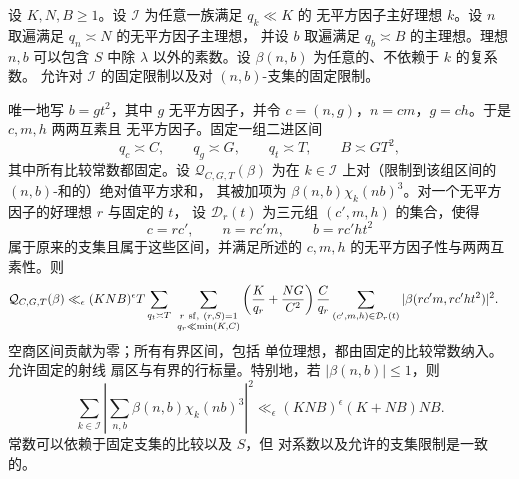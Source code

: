 \begin{lemma}[完备化指标的二次归约]
\label{lem:completed-quadratic-reduction}
设 $K,N,B\ge1$。设 $\mathcal I$ 为任意一族满足 $q_k\ll K$ 的
无平方因子主好理想 $k$。设 $n$ 取遍满足 $q_n\asymp N$ 的无平方因子主理想，
并设 $b$ 取遍满足
$q_b\asymp B$ 的主理想。理想 $n,b$ 可以包含 $S$ 中除
$\lambda$ 以外的素数。设 $\beta(n,b)$ 为任意的、不依赖于 $k$ 的复系数。
允许对 $\mathcal I$ 的固定限制以及对
$(n,b)$-支集的固定限制。

唯一地写 $b=gt^2$，其中 $g$ 无平方因子，并令
$c=(n,g)$，$n=cm$，$g=ch$。于是 $c,m,h$ 两两互素且
无平方因子。固定一组二进区间
\[
 q_c\asymp C,\qquad q_g\asymp G,\qquad q_t\asymp T,
 \qquad B\asymp GT^2,
\]
其中所有比较常数都固定。设 $\mathcal Q_{C,G,T}(\beta)$
为在 $k\in\mathcal I$ 上对（限制到该组区间的 $(n,b)$-和的）绝对值平方求和，
其被加项为
$\beta(n,b)\chi_k(nb)^3$。对一个无平方因子的好理想 $r$ 与固定的 $t$，
设 $\mathcal D_r(t)$ 为三元组 $(c',m,h)$ 的集合，使得
\[
 c=rc',\qquad n=rc'm,\qquad b=rc'ht^2
\]
属于原来的支集且属于这些区间，并满足所述的
$c,m,h$ 的无平方因子性与两两互素性。则
\begin{equation}\label{eq:completed-quadratic-reduction}
 \begin{split}
 \mathcal Q_{C,G,T}(\beta)
 \ll_\epsilon{}&(KNB)^\epsilon T
 \sum_{q_t\asymp T}\ 
 \sum_{\substack{r\ {\rm sf},\ (r,S)=1\\q_r\ll\min(K,C)}}
 \left(\frac K{q_r}+\frac{NG}{C^2}\right)\frac C{q_r}
 \sum_{(c',m,h)\in\mathcal D_r(t)}
       |\beta(rc'm,rc'ht^2)|^2.
 \end{split}
\end{equation}
空商区间贡献为零；所有有界区间，包括
单位理想，都由固定的比较常数纳入。允许固定的射线
扇区与有界的行标量。特别地，若
$|\beta(n,b)|\le1$，则
\begin{equation}\label{eq:completed-quadratic-norm}
 \sum_{k\in\mathcal I}
 \left|\sum_{n,b}\beta(n,b)\chi_k(nb)^3\right|^2
 \ll_\epsilon (KNB)^\epsilon(K+NB)NB.
\end{equation}
常数可以依赖于固定支集的比较以及 $S$，但
对系数以及允许的支集限制是一致的。
\end{lemma}


